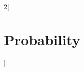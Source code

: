 \documentclass[../../../main.tex]{subfiles}
\begin{document}
\begin{multicols}{2}[\section{Probability}]

\end{multicols}
\end{document}
